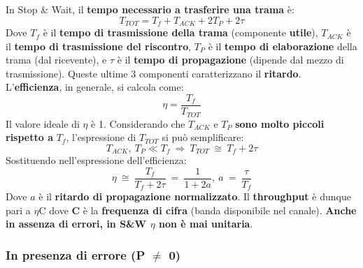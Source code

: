 \documentclass[12pt]{article}
\begin{document}
In Stop \& Wait, il \textbf{tempo necessario a trasferire una trama} è:
\begin{equation*}
    T_{TOT} = T_f + T_{ACK} + 2T_P + 2\tau
\end{equation*}
Dove $T_f$ è il \textbf{tempo di trasmissione della trama} (componente \textbf{utile}), $T_{ACK}$ è il \textbf{tempo di trasmissione del riscontro}, $T_P$ è il \textbf{tempo di elaborazione} della trama (dal ricevente), e $\tau$ è il \textbf{tempo di propagazione} (dipende dal mezzo di trasmissione). Queste ultime 3 componenti caratterizzano il \textbf{ritardo}. L'\textbf{efficienza}, in generale, si calcola come:
\begin{equation*}
    \eta = \frac{T_f}{T_{TOT}}
\end{equation*}
Il valore ideale di $\eta$ è 1. Considerando che $T_{ACK}$ e $T_P$ \textbf{sono molto piccoli rispetto a} $T_f$, l'espressione di $T_{TOT}$ si può semplificare:
\begin{equation*}
    T_{ACK},\ T_P \ll T_f\ \Rightarrow\ T_{TOT}\ \cong\ T_f + 2\tau
\end{equation*}
Sostituendo nell'espressione dell'efficienza:
\begin{equation*}
    \eta\ \cong\ \frac{T_f}{T_f + 2\tau}\ =\ \frac{1}{1 + 2a},\ a\ =\ \frac{\tau}{T_f}
\end{equation*}
Dove $a$ è il \textbf{ritardo di propagazione normalizzato}. Il \textbf{throughput} è dunque pari a $\eta$C dove \textbf{C} è la \textbf{frequenza di cifra} (banda disponibile nel canale). \textbf{Anche in assenza di errori, in S\&W $\eta$ non è mai unitaria}.

\subsubsection{In presenza di errore (P $\neq$ 0)}
\end{document}
